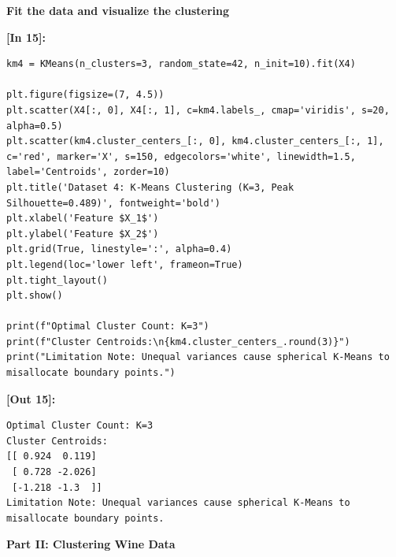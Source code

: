 \vspace{0.3em}
\begin{tcolorbox}[colback=gray!5!white,colframe=gray!50!black,boxrule=0.5pt,arc=2pt,left=4pt,right=4pt,top=2pt,bottom=2pt,unbreakable,before upper={\sloppy\raggedright}]
{\small\bfseries Fit the data and visualize the clustering\par}
\end{tcolorbox}

\vspace{0.4em}
\noindent\textbf{\small [In 15]:}
\begin{lstlisting}[style=pycode]
km4 = KMeans(n_clusters=3, random_state=42, n_init=10).fit(X4)

plt.figure(figsize=(7, 4.5))
plt.scatter(X4[:, 0], X4[:, 1], c=km4.labels_, cmap='viridis', s=20, alpha=0.5)
plt.scatter(km4.cluster_centers_[:, 0], km4.cluster_centers_[:, 1], c='red', marker='X', s=150, edgecolors='white', linewidth=1.5, label='Centroids', zorder=10)
plt.title('Dataset 4: K-Means Clustering (K=3, Peak Silhouette=0.489)', fontweight='bold')
plt.xlabel('Feature $X_1$')
plt.ylabel('Feature $X_2$')
plt.grid(True, linestyle=':', alpha=0.4)
plt.legend(loc='lower left', frameon=True)
plt.tight_layout()
plt.show()

print(f"Optimal Cluster Count: K=3")
print(f"Cluster Centroids:\n{km4.cluster_centers_.round(3)}")
print("Limitation Note: Unequal variances cause spherical K-Means to misallocate boundary points.")
\end{lstlisting}
\noindent\textbf{\small [Out 15]:}
\begin{lstlisting}[style=output]
Optimal Cluster Count: K=3
Cluster Centroids:
[[ 0.924  0.119]
 [ 0.728 -2.026]
 [-1.218 -1.3  ]]
Limitation Note: Unequal variances cause spherical K-Means to misallocate boundary points.
\end{lstlisting}

\vspace{0.3em}
\begin{tcolorbox}[colback=gray!5!white,colframe=gray!50!black,boxrule=0.5pt,arc=2pt,left=4pt,right=4pt,top=2pt,bottom=2pt,unbreakable,before upper={\sloppy\raggedright}]
{\small\bfseries Part II: Clustering Wine Data\par}
\end{tcolorbox}


